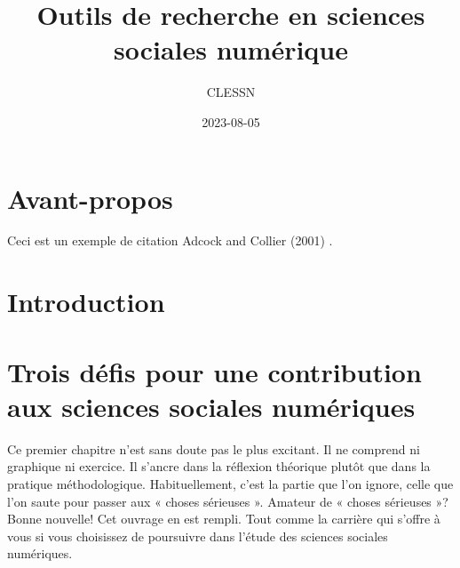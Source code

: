 \documentclass[
  letterpaper,
]{scrbook}
\title{Outils de recherche en sciences sociales numérique}
\author{CLESSN}
\date{2023-08-05}
\renewcommand*\contentsname{Table of contents}
\newcommand\contentsname{Table of contents}
\begin{document}
\frontmatter
\maketitle
\ifdefined\Shaded\renewenvironment{Shaded}{\begin{tcolorbox}[frame hidden, boxrule=0pt, interior hidden, sharp corners, enhanced, borderline west={3pt}{0pt}{shadecolor}, breakable]}{\end{tcolorbox}}\fi

\renewcommand*\contentsname{Table of contents}
{
\setcounter{tocdepth}{2}
\tableofcontents
}
\mainmatter
{}

\hypertarget{avant-propos}{%
\chapter*{Avant-propos}\label{avant-propos}}


Ceci est un exemple de citation Adcock and Collier (2001) .


\hypertarget{introduction}{%
\chapter*{Introduction}\label{introduction}}



\hypertarget{trois-duxe9fis-pour-une-contribution-aux-sciences-sociales-numuxe9riques}{%
\chapter{Trois défis pour une contribution aux sciences sociales
numériques}\label{trois-duxe9fis-pour-une-contribution-aux-sciences-sociales-numuxe9riques}}

Ce premier chapitre n'est sans doute pas le plus excitant. Il ne
comprend ni graphique ni exercice. Il s'ancre dans la réflexion
théorique plutôt que dans la pratique méthodologique. Habituellement,
c'est la partie que l'on ignore, celle que l'on saute pour passer aux «
choses sérieuses ». Amateur de « choses sérieuses »? Bonne nouvelle! Cet
ouvrage en est rempli. Tout comme la carrière qui s'offre à vous si vous
choisissez de poursuivre dans l'étude des sciences sociales numériques.
\end{document}
